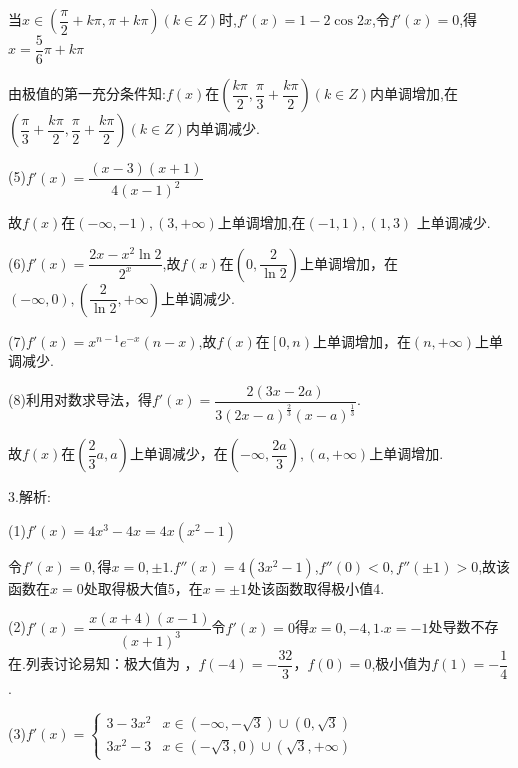 当$x \in \left( {\dfrac{\pi }{2} + k\pi ,\pi  + k\pi } \right)\left( {k \in Z} \right)$时,$f'\left( x \right) = 1 - 2\cos 2x$,令$f'\left( x \right) = 0$,得$x = \dfrac{5}{6}\pi  + k\pi $

由极值的第一充分条件知:$f(x)$在$\left( {\dfrac{{k\pi }}{2},\dfrac{\pi }{3} + \dfrac{{k\pi }}{2}} \right)\left( {k \in Z} \right)$内单调增加,在$\left( {\dfrac{\pi }{3} + \dfrac{{k\pi }}{2},\dfrac{\pi }{2} + \dfrac{{k\pi }}{2}} \right)\left( {k \in Z} \right)$内单调减少.

(5)$f'\left( x \right) = \dfrac{{\left( {x - 3} \right)\left( {x + 1} \right)}}{{4{{\left( {x - 1} \right)}^2}}}$

故$f(x)$在$\left( { - \infty , - 1} \right),\left( {3, + \infty } \right)$上单调增加,在$\left( { - 1,1} \right),\left( {1,3} \right)$
上单调减少.

(6)$f'\left( x \right) = \dfrac{{2x - {x^2}\ln 2}}{{{2^x}}}$,故$f(x)$在$\left( {0,\dfrac{2}{{\ln 2}}} \right)$上单调增加，在$\left( { - \infty ,0} \right),\left( {\dfrac{2}{{\ln 2}}, + \infty } \right)$上单调减少.

(7)$f'\left( x \right) = {x^{n - 1}}{e^{ - x}}\left( {n - x} \right)$,故$f(x)$在$\left[ {0,n} \right)$上单调增加，在$\left( {n, + \infty } \right)$上单调减少.

(8)利用对数求导法，得$f'\left( x \right) = \dfrac{{2\left( {3x - 2a} \right)}}{{3{{\left( {2x - a} \right)}^{\frac{2}{3}}}{{\left( {x - a} \right)}^{\frac{1}{3}}}}}$.

故$f(x)$在$\left( {\dfrac{2}{3}a,a} \right)$上单调减少，在$\left( { - \infty ,\dfrac{{2a}}{3}} \right),\left( {a, + \infty } \right)$上单调增加.

3.解析:

(1)$f'\left( x \right) = 4{x^3} - 4x = 4x\left( {{x^2} - 1} \right)$

令$f'\left( x \right) = 0,$得$x = 0, \pm 1$.$f''\left( x \right) = 4\left( {3{x^2} - 1} \right)$,$f''\left( 0 \right) < 0,f''\left( { \pm 1} \right) > 0$,故该函数在$x = 0$处取得极大值5，在$x =  \pm 1$处该函数取得极小值4.

(2)$f'\left( x \right) = \dfrac{{x\left( {x + 4} \right)\left( {x - 1} \right)}}{{{{\left( {x + 1} \right)}^3}}}$令$f'\left( x \right) = 0$得$x = 0, - 4,1$.$x =  - 1$处导数不存在.列表讨论易知：极大值为 ，$f\left( { - 4} \right) =  - \dfrac{{32}}{3}$，$f\left( 0 \right) = 0$,极小值为$f\left( 1 \right) =  - \dfrac{1}{4}$.

(3)$f'\left( x \right) = \left\{ {\begin{array}{*{20}{l}}
{3 - 3{x^2}}&{x \in \left( { - \infty , - \sqrt 3 } \right) \cup \left( {0,\sqrt 3 } \right)}\\
{3{x^2} - 3}&{x \in \left( { - \sqrt 3 ,0} \right) \cup \left( {\sqrt 3 , + \infty } \right)}
\end{array}} \right.$

